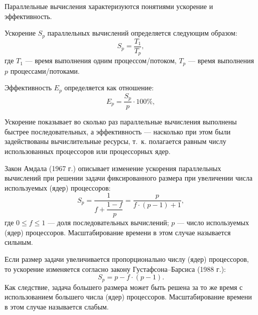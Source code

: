 Параллельные вычисления характеризуются понятиями ускорение и эффективность.

Ускорение $S_p$ параллельных вычислений определяется следующим образом:
\begin{equation}\label{eq31}
   S_p=\dfrac{T_1}{T_p},
\end{equation}                                                                        
где $T_1$ --- время выполнения одним процессом/потоком, $T_p$  ---  время выполнения $p$ процессами/потоками.

Эффективность $E_p$ определяется как отношение:
\begin{equation}\label{eq32}
   E_p=\dfrac{S_p}{p}\cdot 100\%,
\end{equation}                                                                        

Ускорение показывает во сколько раз параллельные вычисления выполнены быстрее последовательных, а эффективность — насколько при этом были задействованы вычислительные ресурсы, т. к.  полагается равным числу использованных процессоров или процессорных ядер.

Закон Амдала (1967 г.) описывает изменение ускорения параллельных вычислений при решении задачи фиксированного размера при увеличении числа используемых (ядер) процессоров:
\begin{equation}\label{eq33}
   S_p=\dfrac{1}{f+\dfrac{1-f}{p}}=\dfrac{p}{f\cdot(p-1)+1},
\end{equation}                                                                        
где $0\leqslant f\leqslant 1$ --- доля последовательных вычислений; $p$ --- число используемых (ядер) процессоров. Масштабирование времени в этом случае называется сильным.

Если размер задачи увеличивается пропорционально числу (ядер) процессоров, то ускорение изменяется согласно закону Густафсона--Барсиса (1988 г.):
\begin{equation}\label{eq34}
   S_p=p-f\cdot(p-1).
\end{equation}                                                                        
Как следствие, задача большего размера может быть решена за то же время с использованием большего числа (ядер) процессоров. Масштабирование времени в этом случае называется слабым.


